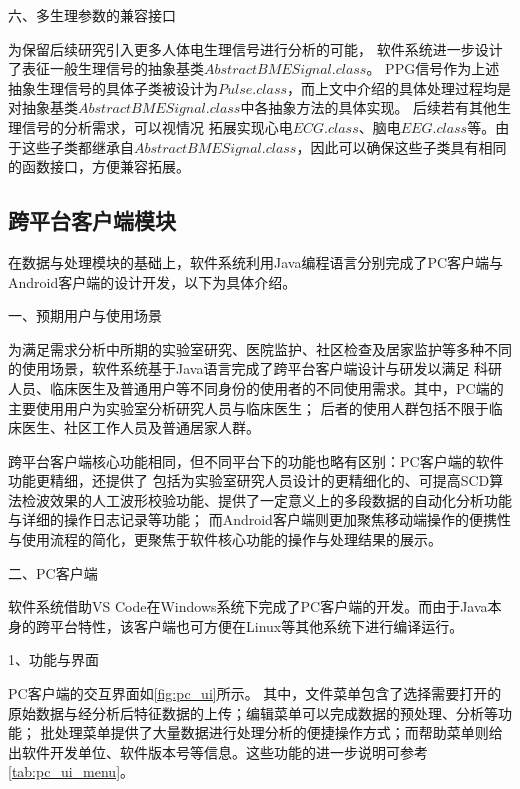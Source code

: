 六、多生理参数的兼容接口

为保留后续研究引入更多人体电生理信号进行分析的可能，
软件系统进一步设计了表征一般生理信号的抽象基类$AbstractBMESignal.class$。
PPG信号作为上述抽象生理信号的具体子类被设计为$Pulse.class$，而上文中介绍的具体处理过程均是对抽象基类$AbstractBMESignal.class$中各抽象方法的具体实现。
后续若有其他生理信号的分析需求，可以视情况
拓展实现心电$ECG.class$、脑电$EEG.class$等。由于这些子类都继承自$AbstractBMESignal.class$，因此可以确保这些子类具有相同的函数接口，方便兼容拓展。

\subsection{跨平台客户端模块}

在数据与处理模块的基础上，软件系统利用Java编程语言分别完成了PC客户端与Android客户端的设计开发，以下为具体介绍。

一、预期用户与使用场景

为满足需求分析中所期的实验室研究、医院监护、社区检查及居家监护等多种不同的使用场景，软件系统基于Java语言完成了跨平台客户端设计与研发以满足
科研人员、临床医生及普通用户等不同身份的使用者的不同使用需求。其中，PC端的主要使用用户为实验室分析研究人员与临床医生；
后者的使用人群包括不限于临床医生、社区工作人员及普通居家人群。

跨平台客户端核心功能相同，但不同平台下的功能也略有区别：PC客户端的软件功能更精细，还提供了
包括为实验室研究人员设计的更精细化的、可提高SCD算法检波效果的人工波形校验功能、提供了一定意义上的多段数据的自动化分析功能与详细的操作日志记录等功能；
而Android客户端则更加聚焦移动端操作的便携性与使用流程的简化，更聚焦于软件核心功能的操作与处理结果的展示。

二、PC客户端

软件系统借助VS Code在Windows系统下完成了PC客户端的开发。而由于Java本身的跨平台特性\cite{openjdk}，该客户端也可方便在Linux等其他系统下进行编译运行。

1、功能与界面

PC客户端的交互界面如\autoref{fig:pc_ui}所示。%
其中，文件菜单包含了选择需要打开的原始数据与经分析后特征数据的上传；编辑菜单可以完成数据的预处理、分析等功能；
批处理菜单提供了大量数据进行处理分析的便捷操作方式；而帮助菜单则给出软件开发单位、软件版本号等信息。这些功能的进一步说明可参考\autoref{tab:pc_ui_menu}。

